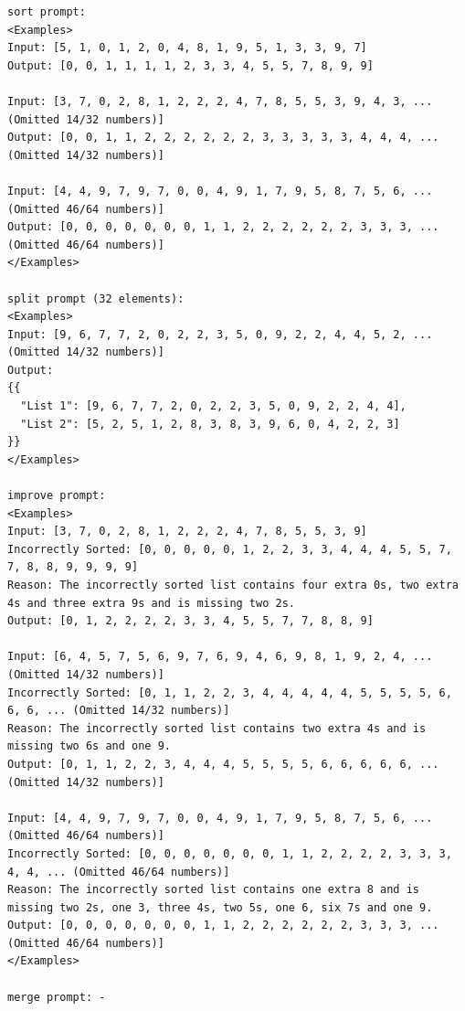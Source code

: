 \documentclass[11pt,UTF8,fontset=fandol]{ctexart}
\begin{document}
\begin{table}[H]\centering
\caption{用于排序任务的每个提示的少样本示例；为简洁起见，部分列表被截断。}
\label{tab:4}
\end{table}
\begin{lstlisting}
sort prompt:
<Examples>
Input: [5, 1, 0, 1, 2, 0, 4, 8, 1, 9, 5, 1, 3, 3, 9, 7]
Output: [0, 0, 1, 1, 1, 1, 2, 3, 3, 4, 5, 5, 7, 8, 9, 9]

Input: [3, 7, 0, 2, 8, 1, 2, 2, 2, 4, 7, 8, 5, 5, 3, 9, 4, 3, ... (Omitted 14/32 numbers)]
Output: [0, 0, 1, 1, 2, 2, 2, 2, 2, 2, 3, 3, 3, 3, 3, 4, 4, 4, ... (Omitted 14/32 numbers)]

Input: [4, 4, 9, 7, 9, 7, 0, 0, 4, 9, 1, 7, 9, 5, 8, 7, 5, 6, ... (Omitted 46/64 numbers)]
Output: [0, 0, 0, 0, 0, 0, 0, 1, 1, 2, 2, 2, 2, 2, 2, 3, 3, 3, ... (Omitted 46/64 numbers)]
</Examples>

split prompt (32 elements):
<Examples>
Input: [9, 6, 7, 7, 2, 0, 2, 2, 3, 5, 0, 9, 2, 2, 4, 4, 5, 2, ... (Omitted 14/32 numbers)]
Output:
{{
  "List 1": [9, 6, 7, 7, 2, 0, 2, 2, 3, 5, 0, 9, 2, 2, 4, 4],
  "List 2": [5, 2, 5, 1, 2, 8, 3, 8, 3, 9, 6, 0, 4, 2, 2, 3]
}}
</Examples>

improve prompt:
<Examples>
Input: [3, 7, 0, 2, 8, 1, 2, 2, 2, 4, 7, 8, 5, 5, 3, 9]
Incorrectly Sorted: [0, 0, 0, 0, 0, 1, 2, 2, 3, 3, 4, 4, 4, 5, 5, 7, 7, 8, 8, 9, 9, 9, 9]
Reason: The incorrectly sorted list contains four extra 0s, two extra 4s and three extra 9s and is missing two 2s.
Output: [0, 1, 2, 2, 2, 2, 3, 3, 4, 5, 5, 7, 7, 8, 8, 9]

Input: [6, 4, 5, 7, 5, 6, 9, 7, 6, 9, 4, 6, 9, 8, 1, 9, 2, 4, ... (Omitted 14/32 numbers)]
Incorrectly Sorted: [0, 1, 1, 2, 2, 3, 4, 4, 4, 4, 4, 5, 5, 5, 5, 6, 6, 6, ... (Omitted 14/32 numbers)]
Reason: The incorrectly sorted list contains two extra 4s and is missing two 6s and one 9.
Output: [0, 1, 1, 2, 2, 3, 4, 4, 4, 5, 5, 5, 5, 6, 6, 6, 6, 6, ... (Omitted 14/32 numbers)]

Input: [4, 4, 9, 7, 9, 7, 0, 0, 4, 9, 1, 7, 9, 5, 8, 7, 5, 6, ... (Omitted 46/64 numbers)]
Incorrectly Sorted: [0, 0, 0, 0, 0, 0, 0, 1, 1, 2, 2, 2, 2, 3, 3, 3, 4, 4, ... (Omitted 46/64 numbers)]
Reason: The incorrectly sorted list contains one extra 8 and is missing two 2s, one 3, three 4s, two 5s, one 6, six 7s and one 9.
Output: [0, 0, 0, 0, 0, 0, 0, 1, 1, 2, 2, 2, 2, 2, 2, 3, 3, 3, ... (Omitted 46/64 numbers)]
</Examples>

merge prompt: -
\end{lstlisting}
\end{document}
